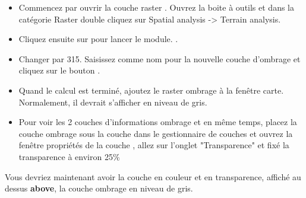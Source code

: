{\begin{itemize}[label=--]
\item Commencez par ouvrir la couche raster . Ouvrez la boite à outils \grass et dans la catégorie Raster double cliquez sur Spatial
analysis -> Terrain analysis.
\item Cliquez ensuite sur  pour lancer le module.
. 
\item Changer  par 315. Saisissez  comme nom pour la nouvelle couche d'ombrage et cliquez sur le bouton .

\item Quand le calcul est terminé, ajoutez le raster ombrage à la fenêtre carte. Normalement, il devrait s'afficher en niveau de gris.
\item Pour voir les 2 couches d'informations ombrage et  en même temps, placez la couche ombrage sous la couche  dans le gestionnaire de couches et ouvrez la fenêtre propriétés de la couche , allez sur l'onglet "Transparence" et fixé la transparence à environ 25\%
\end{itemize}

Vous devriez maintenant avoir la couche  en couleur et en transparence, affiché au dessus \textbf{above}, la couche ombrage en niveau de gris.

}
